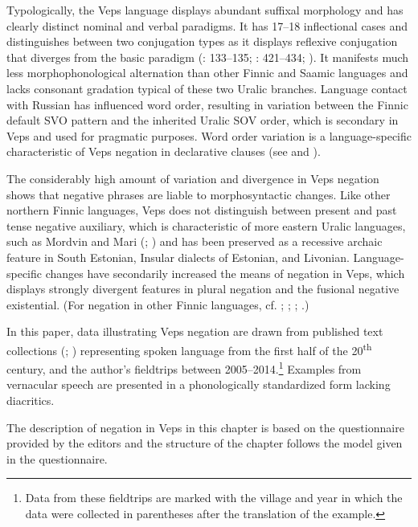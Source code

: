 \documentclass[output=paper,colorlinks=true, citecolor=brown]{langscibook}
\begin{document}
Typologically, the Veps language displays abundant suffixal morphology and has clearly distinct nominal and verbal paradigms. It has 17–18 inflectional cases and distinguishes between two conjugation types as it displays reflexive conjugation that diverges from the basic paradigm (\citealt{Grünthal2015, Grünthal2017}: 133–135; \citealt{MSFOu86}: 421–434; \citealt{Zaitseva1981, Zaitseva2001}). It manifests much less morphophonological alternation than other Finnic and Saamic languages and lacks consonant gradation typical of these two Uralic branches. Language contact with Russian has influenced word order, resulting in variation between the Finnic default SVO pattern and the inherited Uralic SOV order, which is secondary in Veps and used for pragmatic purposes. Word order variation is a language-specific characteristic of Veps negation in declarative clauses (see  and ). 

The considerably high amount of variation and divergence in Veps negation shows that negative phrases are liable to morphosyntactic changes. Like other northern Finnic languages, Veps does not distinguish between present and past tense negative auxiliary, which is characteristic of more eastern Uralic languages, such as Mordvin and Mari (\citealt{HamariAasmäe2015}; \citealt{Saarinen2015}) and has been preserved as a recessive archaic feature in South Estonian, Insular dialects of Estonian, and Livonian. Language-specific changes have secondarily increased the means of negation in Veps, which displays strongly divergent features in plural negation and the fusional negative existential. (For negation in other Finnic languages, cf. \citealt{LindströmEtAl2021}; \citealt{MetslangEtAl2015}; \citealt{RozhanskiMarkus2017}; \citealt{Vilkuna2015, Vilkuna2022}.)

In this paper, data illustrating Veps negation are drawn from published text collections (\citealt{Kettunen1920,Kettunen1925,MSFOu86}; \citealt{MSFOu70}) representing spoken language from the first half of the 20\textsuperscript{th} century, and the author’s fieldtrips between 2005--2014.\footnote{Data from these fieldtrips are marked with the village and year in which the data were collected in parentheses after the translation of the example.} Examples from vernacular speech are presented in a phonologically standardized form lacking diacritics.  

The description of negation in Veps in this chapter is based on the questionnaire provided by the editors  and the structure of the chapter follows the model given in the questionnaire.
\end{document}
